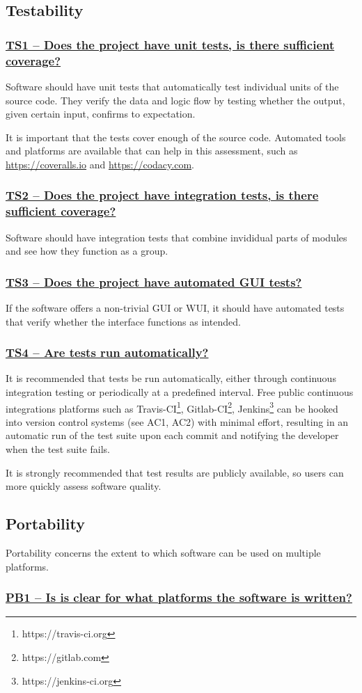 \documentclass[a4paper,11pt]{article}
\newcommand{\indicator}[1]{\subsubsection*{\underline{#1}}}
\begin{document}
\subsection{Testability}

\indicator{TS1 -- Does the project have unit tests, is there sufficient coverage?}

Software should have unit tests that automatically test individual units of the
source code. They verify the data and logic flow by testing whether the output,
given certain input, confirms to expectation.

It is important that the tests cover enough of the source code. Automated tools
and platforms are available that can help in this assessment, such as
\url{https://coveralls.io} and \url{https://codacy.com}.

\indicator{TS2 -- Does the project have integration tests, is there sufficient coverage?}

Software should have integration tests that combine invididual parts of modules and see how they function
as a group.

\indicator{TS3 -- Does the project have automated GUI tests?}

If the software offers a non-trivial GUI or WUI, it should have automated tests
that verify whether the interface functions as intended.

\indicator{TS4 -- Are tests run automatically?}

It is recommended that tests be run automatically, either through continuous
integration testing or periodically at a predefined interval. Free public
continuous integrations platforms such as
Travis-CI\footnote{https://travis-ci.org},
Gitlab-CI\footnote{https://gitlab.com},
Jenkins\footnote{https://jenkins-ci.org} can be hooked into version control
systems (see AC1, AC2) with minimal effort, resulting in an automatic run of the test suite
upon each commit and notifying the developer when the test suite fails.

It is strongly recommended that test results are publicly available, so users
can more quickly assess software quality.

\subsection{Portability}

Portability concerns the extent to which software can be used on multiple
platforms. 

\indicator{PB1 -- Is is clear for what platforms the software is written?}
\end{document}
